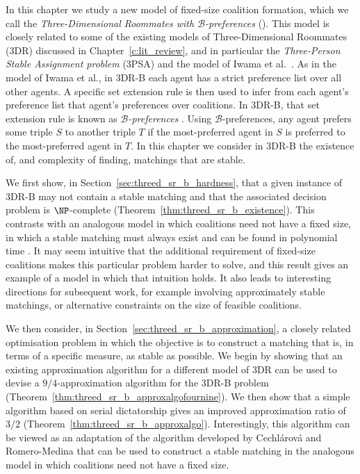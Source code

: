 In this chapter we study a new model of fixed-size coalition formation, which we call the \emph{Three-Dimensional Roommates with $\mathscr{B}$-preferences} (). This model is closely related to some of the existing models of Three-Dimensional Roommates (3DR) discussed in Chapter~\ref{c:lit_review}, and in particular the \emph{Three-Person Stable Assignment problem} (3PSA) \cite{NH91} and the model of Iwama et al.~\cite{IMO07}. As in the model of Iwama et al., in 3DR-B each agent has a strict preference list over all other agents. A specific set extension rule is then used to infer from each agent's preference list that agent's preferences over coalitions. In 3DR-B, that set extension rule is known as \emph{$\mathscr{B}$-preferences} \cite{CH02}. Using $\mathscr{B}$-preferences, any agent prefers some triple $S$ to another triple $T$ if the most-preferred agent in $S$ is preferred to the most-preferred agent in $T$. In this chapter we consider in 3DR-B the existence of, and complexity of finding, matchings that are stable.


We first show, in Section~\ref{sec:threed_sr_b_hardness}, that a given instance of 3DR-B may not contain a stable matching and that the associated decision problem is $\NP$-complete (Theorem~\ref{thm:threed_sr_b_existence}). This contrasts with an analogous model in which coalitions need not have a fixed size, in which a stable matching must always exist and can be found in polynomial time \cite{CR01}. It may seem intuitive that the additional requirement of fixed-size coalitions makes this particular problem harder to solve, and this result gives an example of a model in which that intuition holds. It also leads to interesting directions for subsequent work, for example involving approximately stable matchings, or alternative constraints on the size of feasible coalitions.

We then consider, in Section~\ref{sec:threed_sr_b_approximation}, a closely related optimisation problem in which the objective is to construct a matching that is, in terms of a specific measure, as stable as possible. We begin by showing that an existing approximation algorithm for a different model of 3DR can be used to devise a $9/4$-approximation algorithm for the 3DR-B problem (Theorem~\ref{thm:threed_sr_b_approxalgofournine}). We then show that a simple algorithm based on serial dictatorship gives an improved approximation ratio of $3/2$ (Theorem~\ref{thm:threed_sr_b_approxalgo}). Interestingly, this algorithm can be viewed as an adaptation of the algorithm developed by Cechl\'{a}rov\'{a} and Romero-Medina \cite{CR01} that can be used to construct a stable matching in the analogous model in which coalitions need not have a fixed size.

